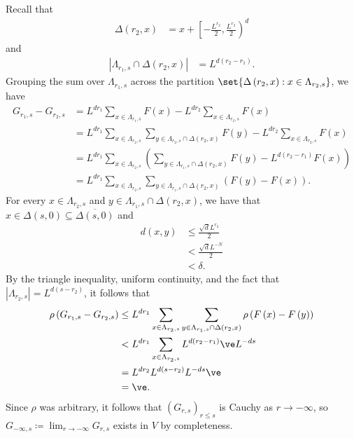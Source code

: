 \documentclass[10pt]{mypackage}
\renewcommand{\coloneq}{\coloneqq}
\begin{document}
\begin{solution}
  Recall that
  \begin{align*}
    \Delta\left( r_2,x \right) &= x + \left[ -\frac{L^{r_2}}{2},\frac{L^{r_2}}{2} \right)^{d}
  \end{align*}
  and
  \begin{align*}
    \left\vert \Lambda_{r_1,s}\cap \Delta\left( r_2,x \right) \right\vert &= L^{d\left( r_2-r_1 \right)}.
  \end{align*}
  Grouping the sum over $\Lambda_{r_1,s}$ across the partition $\set{\Delta\left( r_2,x \right) : x\in \Lambda_{r_2,s}}$, we have
  \begin{align*}
    G_{r_1,s} - G_{r_2,s} &= L^{dr_1}\sum_{x\in \Lambda_{r_1,s}}F(x) - L^{dr_2}\sum_{x\in \Lambda_{r_2,s}}F(x)\\
                          &= L^{dr_1}\sum_{x\in \Lambda_{r_2,s}}\sum_{y\in \Lambda_{r_2,s}\cap \Delta\left( r_2,x \right)}F(y) - L^{dr_2}\sum_{x\in \Lambda_{r_2,s}}F(x)\\
                          &= L^{dr_1}\sum_{x\in \Lambda_{r_2,s}}\left( \sum_{y\in \Lambda_{r_1,s}\cap \Delta\left( r_2,x \right)}F(y) - L^{d\left( r_2-r_1 \right)} F(x) \right)\\
                          &= L^{dr_1}\sum_{x\in \Lambda_{r_2,s}}\sum_{y\in \Lambda_{r_1,s}\cap \Delta\left( r_2,x \right)} \left( F(y)-F(x) \right).
  \end{align*}
  For every $x\in \Lambda_{r_2,s}$ and $y\in \Lambda_{r_1,s}\cap \Delta\left( r_2,x \right)$, we have that $x\in \Delta\left( s,0 \right)\subseteq \overline{\Delta\left( s,0 \right)}$ and
  \begin{align*}
    d\left( x,y \right) &\leq \frac{\sqrt{d}L^{r_2}}{2}\\
                        &< \frac{\sqrt{d}L^{-N}}{2}\\
                        &< \delta.
  \end{align*}
  By the triangle inequality, uniform continuity, and the fact that $\left\vert \Lambda_{r_2,s} \right\vert = L^{d\left( s-r_2 \right)}$, it follows that
  \begin{align*}
    \rho\left( G_{r_1,s}-G_{r_2,s} \right) &\leq L^{dr_1}\sum_{x\in\Lambda_{r_2,s}}\sum_{y\in \Lambda_{r_1,s}\cap \Delta\left( r_2,x \right)}\rho\left( F\left( x \right)-F\left( y \right) \right)\\
                                           &< L^{dr_1}\sum_{x\in \Lambda_{r_2,s}}L^{d\left( r_2-r_1 \right)}\ve L^{-ds}\\
                                           &= L^{dr_2}L^{d\left( s-r_2 \right)}L^{-ds}\ve\\
                                           &= \ve.
  \end{align*}
  Since $\rho$ was arbitrary, it follows that $\left( G_{r,s} \right)_{r\leq s}$ is Cauchy as $r\to -\infty$, so $G_{-\infty,s}\coloneq \lim_{r\to-\infty}G_{r,s}$ exists in $V$ by completeness.


\end{solution}
\end{document}
